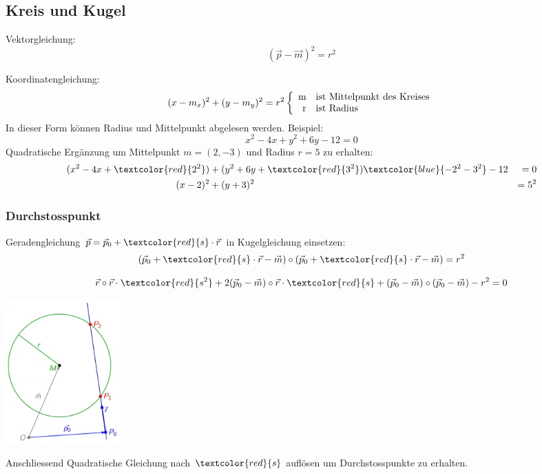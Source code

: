 \subsection{Kreis und Kugel}
\noindent Vektorgleichung:
\[(\vec{p} - \vec{m})^2 = r^2\]

\noindent Koordinatengleichung:
\[ (x - m_x)^2 + (y - m_y)^2 = r^2 \left\lbrace \begin{array}{r@{\quad}l}
		$m$ & \text{ist Mittelpunkt des Kreises}\\
		$r$ & \text{ist Radius}
	\end{array}\right.
\]
\noindent In dieser Form können Radius und Mittelpunkt abgelesen werden. Beispiel:
\[x^2 - 4x +y^2 + 6y - 12 = 0\]
Quadratische Ergänzung um Mittelpunkt $m = (2, -3)$ und Radius $r = 5$ zu erhalten:
\begin{align*}
	(x^2 - 4x + \textcolor{red}{2^2}) &+ (y^2 + 6y + \textcolor{red}{3^2}) \textcolor{blue}{- 2^2 - 3^2} - 12 &= 0 \\
	(x - 2)^2 &+ (y + 3)^2 &= 5^2
\end{align*}

\subsubsection{Durchstosspunkt}
Geradengleichung $\vec{p} = \vec{p}_0 + \textcolor{red}{s} \cdot \vec{r}$ in Kugelgleichung einsetzen:
\[
	(\vec{p}_0 + \textcolor{red}{s} \cdot \vec{r} - \vec{m}) \circ (\vec{p}_0 + \textcolor{red}{s} \cdot \vec{r} - \vec{m}) = r^2
\]

\[
	\vec{r} \circ \vec{r}  \cdot \textcolor{red}{s^2} + 2(\vec{p}_0 - \vec{m}) \circ \vec{r} \cdot \textcolor{red}{s} + (\vec{p}_0 - \vec{m})\circ(\vec{p}_0 - \vec{m}) - r^2  =0
\]

\begin{center}
	\includegraphics[width=12em]{./Images/Kugelgleichung.png}
\end{center}

\noindent Anschliessend Quadratische Gleichung nach $\textcolor{red}{s}$ auflösen um Durchstosspunkte zu erhalten.

